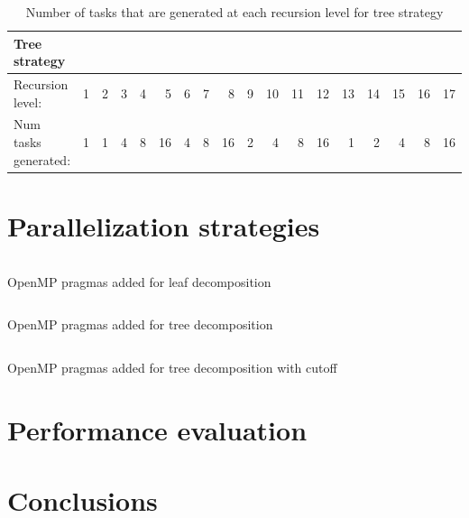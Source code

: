 \begin{table}[H]
\centering
\begin{tabular}{lrrrrrrrrrrrrrrrrr}
\toprule
Tree strategy & & & & & & & & & & & & & & & & &\\
\midrule
Recursion level:        & 1     & 2     & 3     & 4     & 5     & 6     & 7     & 8     & 9     & 10    & 11    & 12    & 13    & 14    & 15    & 16    & 17  \\
Num tasks generated:    & 1     & 1     & 4     & 8     & 16    & 4     & 8     & 16    & 2     & 4     & 8     & 16    & 1     & 2     & 4     & 8    & 16 \\
\bottomrule
\end{tabular}

\caption{Number of tasks that are generated at each recursion level for tree strategy} 
\label{tab:Execution_time}
\end{table}


\section{Parallelization strategies}%
\label{sec:par_strats}


\begin{listing}[H]
\inputminted[firstline=32,lastline=63]{c}{sources/multisort-omp-leaf.c}
\caption{OpenMP pragmas added for leaf decomposition}
\label{listing:omp_leaf}
\end{listing}

\begin{listing}[H]
\inputminted[firstline=32,lastline=74]{c}{sources/multisort-omp-tree.c}
\caption{OpenMP pragmas added for tree decomposition}
\label{listing:omp_tree}
\end{listing}

\begin{listing}[H]
\inputminted[firstline=32,lastline=74]{c}{sources/multisort-omp-tree-cutoff.c}
\caption{OpenMP pragmas added for tree decomposition with cutoff}
\label{listing:omp_tree_cutoff}
\end{listing}

\section{Performance evaluation}%
\label{sec:perf_eval}

\section{Conclusions}%
\label{sec:conclusions}


